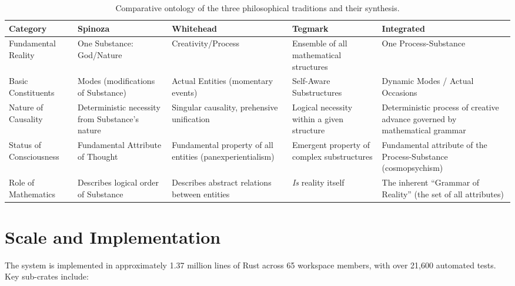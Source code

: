 \documentclass[12pt]{book}
\begin{document}
\begin{table}[H]
\centering
\caption{Comparative ontology of the three philosophical traditions and their synthesis.}
\label{tab:kosmic-ontology}
\small
\begin{tabularx}{\textwidth}{lXXXX}
\toprule
\textbf{Category} & \textbf{Spinoza} & \textbf{Whitehead} & \textbf{Tegmark} & \textbf{Integrated} \\
\midrule
Fundamental Reality & One Substance: God/Nature & Creativity/Process & Ensemble of all mathematical structures & One Process-Substance \\
\addlinespace
Basic Constituents & Modes (modifications of Substance) & Actual Entities (momentary events) & Self-Aware Substructures & Dynamic Modes / Actual Occasions \\
\addlinespace
Nature of Causality & Deterministic necessity from Substance's nature & Singular causality, prehensive unification & Logical necessity within a given structure & Deterministic process of creative advance governed by mathematical grammar \\
\addlinespace
Status of Consciousness & Fundamental Attribute of Thought & Fundamental property of all entities (panexperientialism) & Emergent property of complex substructures & Fundamental attribute of the Process-Substance (cosmopsychism) \\
\addlinespace
Role of Mathematics & Describes logical order of Substance & Describes abstract relations between entities & \textit{Is} reality itself & The inherent ``Grammar of Reality'' (the set of all attributes) \\
\bottomrule
\end{tabularx}
\end{table}


\section{Scale and Implementation}

The system is implemented in approximately 1.37 million lines of Rust across 65 workspace members, with over 21,600 automated tests. Key sub-crates include:
\end{document}
